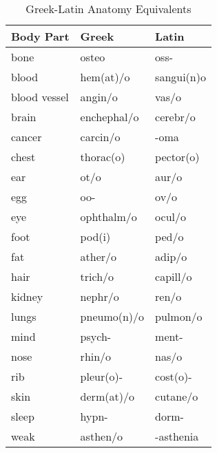 \documentclass[../../EMT-169.tex]{subfiles}
\begin{document}
\begin{table}[ht]
	\centering
	\caption{Greek-Latin Anatomy Equivalents}
	\begin{tabular}{|p{3.5cm}|P{4cm}|P{4cm}|}
		\hline
		\textbf{Body Part}	& \textbf{Greek}	& \textbf{Latin}	\\ \hline
		\hline
		bone         		& osteo				& oss-       		\\ \hline
		blood       		& hem(at)/o   		& sangui(n)o 		\\ \hline
		blood vessel 		& angin/o     		& vas/o      		\\ \hline
		brain        		& enchephal/o 		& cerebr/o   		\\ \hline
		cancer       		& carcin/o    		& -oma       		\\ \hline
		chest        		& thorac(o)   		& pector(o)  		\\ \hline
		ear         		& ot/o        		& aur/o      		\\ \hline
		egg          		& oo-         		& ov/o       		\\ \hline
		eye          		& ophthalm/o  		& ocul/o     		\\ \hline
		foot         		& pod(i)      		& ped/o     	 	\\ \hline
		fat          		& ather/o     		& adip/o     		\\ \hline
		hair         		& trich/o     		& capill/o   		\\ \hline
		kidney       		& nephr/o     		& ren/o      		\\ \hline
		lungs        		& pneumo(n)/o 		& pulmon/o   		\\ \hline
		mind         		& psych-      		& ment-      		\\ \hline
		nose         		& rhin/o      		& nas/o      		\\ \hline
		rib          		& pleur(o)-   		& cost(o)-   		\\ \hline
		skin         		& derm(at)/o  		& cutane/o   		\\ \hline
		sleep        		& hypn-       		& dorm-      		\\ \hline
		weak         		& asthen/o    		& -asthenia  		\\ \hline
	\end{tabular}
\end{table}
\end{document}
